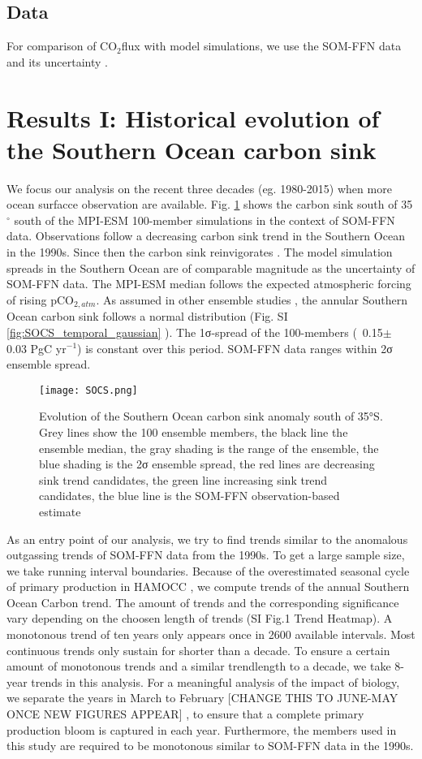 \documentclass[12pt]{article}
\begin{document}
\subsection{Data}
For comparison of CO$_2$flux with model simulations, we use the SOM-FFN data and its uncertainty \cite{landschuetzer2016}.


\section{Results I: Historical evolution of the Southern Ocean carbon sink}

We focus our analysis on the recent three decades (eg. 1980-2015) when more ocean surfacce observation are available. Fig. \ref{fig:evolution_southern_ocean_carbon_sink} shows the carbon sink south of 35$^\circ$ south of the MPI-ESM 100-member simulations in the context of SOM-FFN data. Observations follow a decreasing carbon sink trend in the Southern Ocean in the 1990s. Since then the carbon sink reinvigorates \cite{landschuetzer2016}. The model simulation spreads in the Southern Ocean are of comparable magnitude as the uncertainty of SOM-FFN data. The MPI-ESM median follows the expected atmospheric forcing of rising pCO$_{2,atm}$. As assumed in other ensemble studies \cite{Thompson2015}, the annular Southern Ocean carbon sink follows a normal distribution (Fig. SI \ref{fig:SOCS_temporal_gaussian} ). The 1σ-spread of the 100-members (~0.15$\pm$ 0.03 PgC yr$^{-1}$) is constant over this period. SOM-FFN data ranges within 2σ ensemble spread. 

\begin{figure}
\texttt{[image: SOCS.png]}
\label{fig:evolution_southern_ocean_carbon_sink}
\caption{Evolution of the Southern Ocean carbon sink anomaly south of 35°S. Grey lines show the 100 ensemble members, the black line the ensemble median, the gray shading is the range of the ensemble, the blue shading is the 2σ ensemble spread, the red lines are decreasing sink trend candidates, the green line increasing sink trend candidates, the blue line is the SOM-FFN observation-based estimate}
\end{figure}

As an entry point of our analysis, we try to find trends similar to the anomalous outgassing trends of SOM-FFN data from the 1990s. To get a large sample size, we take running interval boundaries. Because of the overestimated seasonal cycle of primary production in HAMOCC \cite{Nevison2016}, we compute trends of the annual Southern Ocean Carbon trend. The amount of trends and the corresponding significance vary depending on the choosen length of trends (SI Fig.1 Trend Heatmap). A monotonous trend of ten years only appears once in 2600 available intervals. Most continuous trends only sustain for shorter than a decade. To ensure a certain amount of monotonous trends and a similar trendlength to a decade, we take 8-year trends in this analysis. For a meaningful analysis of the impact of biology, we separate the years in March to February [CHANGE THIS TO JUNE-MAY ONCE NEW FIGURES APPEAR] , to ensure that a complete primary production bloom is captured in each year. Furthermore, the members used in this study are required to be monotonous similar to SOM-FFN data in the 1990s.
 
\end{document}
